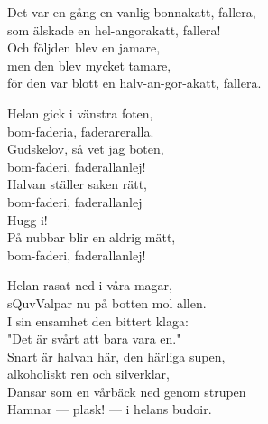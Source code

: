 \documentclass[a6paper, 10pt, twoside]{article}
\begin{document}
\newpage
\noindent
\begin{center}
\end{center}
\begin{lyrics}
Det var en gång en vanlig bonnakatt, fallera, \\
som älskade en hel-angorakatt, fallera! \\
Och följden blev en jamare, \\
men den blev mycket tamare, \\
för den var blott en halv-an-gor-akatt, fallera. 
\end{lyrics}
\begin{center}
\end{center}
\begin{lyrics}
Helan gick i vänstra foten, \\
bom-faderia, faderareralla. \\
Gudskelov, så vet jag boten, \\
bom-faderi, faderallanlej! \\
Halvan ställer saken rätt, \\
bom-faderi, faderallanlej \\
Hugg i! \\
På nubbar blir en aldrig mätt, \\
bom-faderi, faderallanlej! 
\end{lyrics}
\begin{center}
\end{center}
\begin{lyrics}
Helan rasat ned i våra magar, \\
sQuvValpar nu på botten mol allen. \\
I sin ensamhet den bittert klaga: \\
"Det är svårt att bara vara en." \\
Snart är halvan här, den härliga supen, \\
alkoholiskt ren och silverklar, \\
Dansar som en vårbäck ned genom strupen \\
Hamnar --- plask! --- i helans budoir. 
\end{lyrics}
\end{document}
